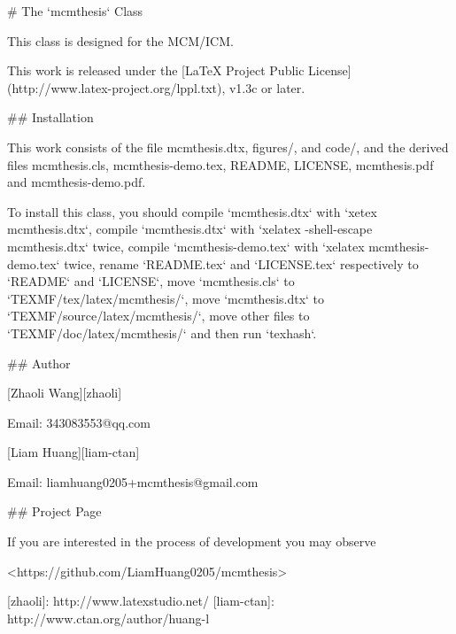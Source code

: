 # The `mcmthesis` Class

This class is designed for the MCM/ICM.

This work is released under the [LaTeX Project Public
License](http://www.latex-project.org/lppl.txt), v1.3c or later.

## Installation

This work consists of the file mcmthesis.dtx,
                               figures/, and
                               code/,
and the derived files          mcmthesis.cls,
                               mcmthesis-demo.tex,
                               README,
                               LICENSE,
                               mcmthesis.pdf and
                               mcmthesis-demo.pdf.

To install this class, you should
    compile `mcmthesis.dtx` with `xetex mcmthesis.dtx`,
    compile `mcmthesis.dtx` with `xelatex -shell-escape mcmthesis.dtx` twice,
    compile `mcmthesis-demo.tex` with `xelatex mcmthesis-demo.tex` twice,
    rename `README.tex` and `LICENSE.tex` respectively to
      `README` and `LICENSE`,
    move `mcmthesis.cls` to `TEXMF/tex/latex/mcmthesis/`,
    move `mcmthesis.dtx` to `TEXMF/source/latex/mcmthesis/`,
    move other files     to `TEXMF/doc/latex/mcmthesis/` and then
    run `texhash`.

## Author

[Zhaoli Wang][zhaoli]

Email: 343083553@qq.com

[Liam Huang][liam-ctan]

Email: liamhuang0205+mcmthesis@gmail.com

## Project Page

If you are interested in the process of development you may observe

<https://github.com/LiamHuang0205/mcmthesis>

[zhaoli]: http://www.latexstudio.net/
[liam-ctan]: http://www.ctan.org/author/huang-l
